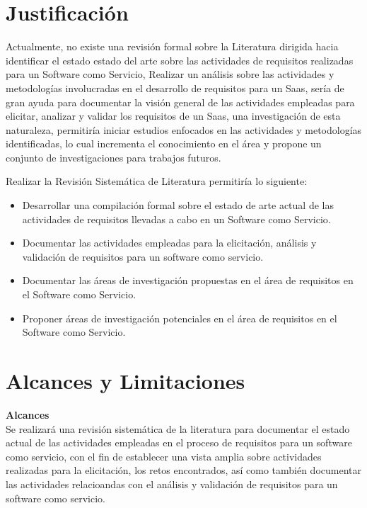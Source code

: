 \documentclass{article}
\begin{document}
\newpage

\section{Justificación}

Actualmente, no existe una revisión formal sobre la Literatura dirigida hacia identificar el estado estado del arte sobre las actividades de requisitos realizadas para un Software como Servicio, 
Realizar un análisis sobre las actividades y metodologías involucradas en el desarrollo de requisitos para un Saas, sería de gran ayuda para documentar la visión general de las actividades 
empleadas para elicitar, analizar y validar los requisitos de un Saas, una investigación de esta naturaleza, permitiría iniciar estudios enfocados en las actividades y metodologías 
identificadas, lo cual incrementa el conocimiento en el área y  propone un conjunto de investigaciones para trabajos futuros.

Realizar la Revisión Sistemática de Literatura permitiría lo siguiente: 

\begin{itemize}
    \item Desarrollar una compilación formal sobre el estado de arte actual de las actividades de requisitos llevadas a cabo en un Software como Servicio.
    \item Documentar las actividades empleadas para la elicitación, análisis y validación de requisitos para un software como servicio.
    \item Documentar las áreas de investigación propuestas  en el área de requisitos en el Software como Servicio.
    \item Proponer áreas de investigación potenciales en el área de requisitos en el Software como Servicio.
\end{itemize}
\newpage

\section{Alcances y Limitaciones}
\textbf{Alcances} \\
Se realizará una revisión sistemática de la literatura para documentar el estado actual de las actividades 
empleadas en el proceso de requisitos para un software como servicio, con el fin de establecer una vista 
amplia sobre actividades realizadas para la elicitación, los retos encontrados, así como también
documentar las actividades relacioandas con el análisis y validación de requisitos para un software como servicio. 
\end{document}
